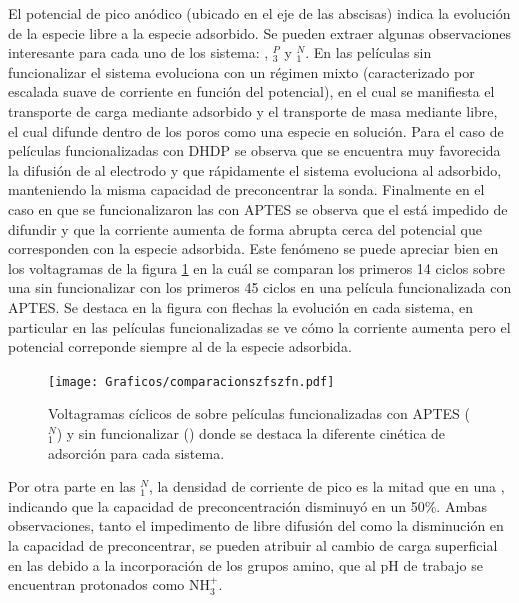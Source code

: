 	  	 El potencial de pico anódico (ubicado en el eje de las abscisas) indica la evolución de la especie \ru\space libre a la especie \ru\space adsorbido. Se pueden extraer algunas observaciones interesante para cada uno de los sistema: \pdmZ, \pdmZ$^P_3$ y \pdmZ$^N_1$. En las películas sin funcionalizar el sistema evoluciona con un régimen mixto (caracterizado por escalada suave de corriente en función del potencial), en el cual se manifiesta el transporte de carga mediante \ru\space adsorbido y el transporte de masa mediante \ru\space libre, el cual difunde dentro de los poros como una especie en solución. Para el caso de películas funcionalizadas con DHDP se observa que se encuentra muy favorecida la difusión de \ru\space al electrodo y que rápidamente el sistema evoluciona al adsorbido, manteniendo la misma capacidad de preconcentrar la sonda. Finalmente en el caso en que se funcionalizaron las \pdmZ\space con APTES se observa que el \ru\space está impedido de difundir y que la corriente aumenta de forma abrupta cerca del potencial que corresponden con la especie \ru\space adsorbida. Este fenómeno se puede apreciar bien en los voltagramas de la figura \ref{fig:compaptesnoaptes} en la cuál se comparan los primeros 14 ciclos sobre una \pdmZ\space sin funcionalizar con los primeros 45 ciclos en una película funcionalizada con APTES. Se destaca en la figura con flechas la evolución en cada sistema, en particular en las películas funcionalizadas se ve cómo la corriente aumenta pero el potencial correponde siempre al de la especie adsorbida.

	 	 		 \begin{figure}[h!]	
					\centering
			 	    \texttt{[image: Graficos/comparacionszfszfn.pdf]}
			        \caption[Evolución de la señal de \ru\space para distintos sistemas]{Voltagramas cíclicos de \ru\space sobre películas funcionalizadas con APTES (\pdmZ$^N_1$) y sin funcionalizar (\pdmZ) donde se destaca la diferente cinética de adsorción para cada sistema.}
			        \vspace*{4mm}
			        \label{fig:compaptesnoaptes}
			      	\end{figure}


	 	 Por otra parte en las \pdmZ$^N_1$, la densidad de corriente de pico es la mitad que en una \pdmZ, indicando que la capacidad de preconcentración disminuyó en un 50\%. Ambas observaciones, tanto el impedimento de libre difusión del \ru\space como la disminución en la capacidad de preconcentrar, se pueden atribuir al cambio de carga superficial en las \pdmZ\space debido a la incorporación de los grupos amino, que al pH de trabajo se encuentran protonados como NH$_3^+$.\cite{calvo2009f}

